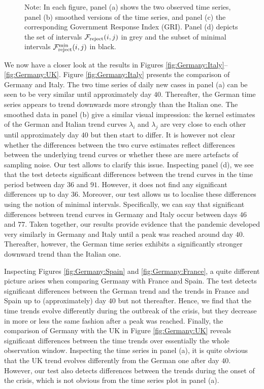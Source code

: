 \documentclass[a4paper,12pt]{article}
\numberwithin{equation}{section}
\begin{document}
\begin{figure}[p!]
\caption*{Note: In each figure, panel (a) shows the two observed time series, panel (b) smoothed versions of the time series, and panel (c) the corresponding Government Response Index (GRI). Panel (d) depicts the set of intervals $\mathcal{F}_{\text{reject}}(i,j)$ in grey and the subset of minimal intervals $\mathcal{F}_{\text{reject}}^{\text{min}}(i,j)$ in black.}
\end{figure}


We now have a closer look at the results in Figures \ref{fig:Germany:Italy}--\ref{fig:Germany:UK}. Figure \ref{fig:Germany:Italy} presents the comparison of Germany and Italy. The two time series of daily new cases in panel (a) can be seen to be very similar until approximately day $40$. Thereafter, the German time series appears to trend downwards more strongly than the Italian one. The smoothed data in panel (b) give a similar visual impression: the kernel estimates of the German and Italian trend curves $\lambda_i$ and $\lambda_j$ are very close to each other until approximately day $40$ but then start to differ. It is however not clear whether the differences between the two curve estimates reflect differences between the underlying trend curves or whether these are mere artefacts of sampling noise. Our test allows to clarify this issue. Inspecting panel (d), we see that the test detects significant differences between the trend curves in the time period between day $36$ and $91$. However, it does not find any significant differences up to day $36$. Moreover, our test allows us to localise these differences using the notion of minimal intervals. Specifically, we can say that significant differences between trend curves in Germany and Italy occur between days $46$ and $77$. Taken together, our results provide evidence that the pandemic developed very similarly in Germany and Italy until a peak was reached around day $40$. Thereafter, however, the German time series exhibits a significantly stronger downward trend than the Italian one. 


Inspecting Figures \ref{fig:Germany:Spain} and  \ref{fig:Germany:France}, a quite different picture arises when comparing Germany with France and Spain. The test detects significant differences between the German trend and the trends in France and Spain up to (approximately) day $40$ but not thereafter. Hence, we find that the time trends evolve differently during the outbreak of the crisis, but they decrease in more or less the same fashion after a peak was reached. Finally, the comparison of Germany with the UK in Figure \ref{fig:Germany:UK} reveals significant differences between the time trends over essentially the whole observation window. Inspecting the time series in panel (a), it is quite obvious that the UK trend evolves differently from the German one after day $40$. However, our test also detects differences between the trends during the onset of the crisis, which is not obvious from the time series plot in panel (a). 
\end{document}
